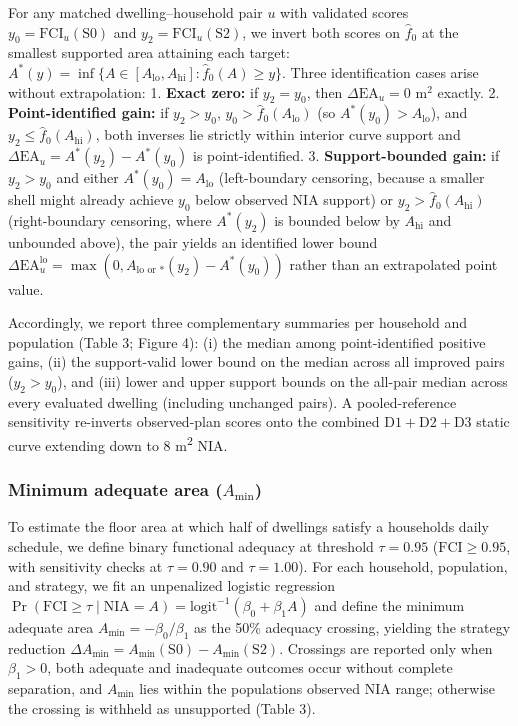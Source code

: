 \documentclass[12pt,letterpaper]{article}
\begin{document}
For any matched dwelling--household pair \(u\) with validated scores \(y_0 = \text{FCI}_u(\text{S0})\) and \(y_2 = \text{FCI}_u(\text{S2})\), we invert both scores on \(\hat{f}_0\) at the smallest supported area attaining each target: \(A^*(y) = \inf \{A \in [A_{\text{lo}}, A_{\text{hi}}] : \hat{f}_0(A) \ge y\}\). Three identification cases arise without extrapolation: 1. \textbf{Exact zero:} if \(y_2 = y_0\), then \(\Delta\text{EA}_u = 0\text{ m}^2\) exactly. 2. \textbf{Point-identified gain:} if \(y_2 > y_0\), \(y_0 > \hat{f}_0(A_{\text{lo}})\) (so \(A^*(y_0) > A_{\text{lo}}\)), and \(y_2 \le \hat{f}_0(A_{\text{hi}})\), both inverses lie strictly within interior curve support and \(\Delta\text{EA}_u = A^*(y_2) - A^*(y_0)\) is point-identified. 3. \textbf{Support-bounded gain:} if \(y_2 > y_0\) and either \(A^*(y_0) = A_{\text{lo}}\) (left-boundary censoring, because a smaller shell might already achieve \(y_0\) below observed NIA support) or \(y_2 > \hat{f}_0(A_{\text{hi}})\) (right-boundary censoring, where \(A^*(y_2)\) is bounded below by \(A_{\text{hi}}\) and unbounded above), the pair yields an identified lower bound \(\Delta\text{EA}_u^{\text{lo}} = \max(0, A_{\text{lo or } *}(y_2) - A^*(y_0))\) rather than an extrapolated point value.

Accordingly, we report three complementary summaries per household and population (Table 3; Figure 4): (i) the median among point-identified positive gains, (ii) the support-valid lower bound on the median across all improved pairs (\(y_2 > y_0\)), and (iii) lower and upper support bounds on the all-pair median across every evaluated dwelling (including unchanged pairs). A pooled-reference sensitivity re-inverts observed-plan scores onto the combined \(\text{D1}+\text{D2}+\text{D3}\) static curve extending down to 8 m\textsuperscript{2} NIA.

\subsubsection{\texorpdfstring{Minimum adequate area (\(A_{\min}\))}{Minimum adequate area (A\_\{\textbackslash min\})}}\label{minimum-adequate-area-a_min}

To estimate the floor area at which half of dwellings satisfy a household\textquotesingle s daily schedule, we define binary functional adequacy at threshold \(\tau = 0.95\) (\(\text{FCI} \ge 0.95\), with sensitivity checks at \(\tau = 0.90\) and \(\tau = 1.00\)). For each household, population, and strategy, we fit an unpenalized logistic regression \(\Pr(\text{FCI} \ge \tau \mid \text{NIA} = A) = \text{logit}^{-1}(\beta_0 + \beta_1 A)\) and define the minimum adequate area \(A_{\min} = -\beta_0 / \beta_1\) as the 50\% adequacy crossing, yielding the strategy reduction \(\Delta A_{\min} = A_{\min}(\text{S0}) - A_{\min}(\text{S2})\). Crossings are reported only when \(\beta_1 > 0\), both adequate and inadequate outcomes occur without complete separation, and \(A_{\min}\) lies within the population\textquotesingle s observed NIA range; otherwise the crossing is withheld as unsupported (Table 3).
\end{document}
